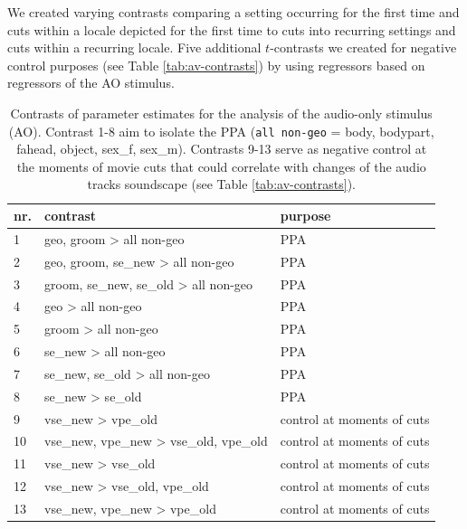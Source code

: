 \documentclass[english]{article}
\begin{document}

We created varying contrasts comparing a setting occurring for the first
time and cuts within a locale depicted for the first time to cuts into recurring
settings and cuts within a recurring locale.
Five additional $t$-contrasts we created for negative control purposes (see
Table \ref{tab:av-contrasts}) by using regressors based on regressors of the AO
stimulus.


\begin{table}[h!]
\caption{Contrasts of parameter estimates for the analysis of the audio-only stimulus (AO).
Contrast 1-8 aim to isolate the PPA (\texttt{all non-geo} = body, bodypart,
    fahead, object, sex\_f, sex\_m).
Contrasts 9-13 serve as negative control at the moments of movie cuts that could
    correlate with changes of the audio tracks soundscape (see Table \ref{tab:av-contrasts}).}
\label{tab:ao-contrasts}
\footnotesize
\begin{tabular}{lll}
\toprule
\textbf{nr.} &  \textbf{contrast} & \textbf{purpose} \\
\midrule
1 & geo, groom > all non-geo & PPA \tabularnewline
2 & geo, groom, se\_new > all non-geo & PPA \tabularnewline
3 & groom, se\_new, se\_old > all non-geo & PPA \tabularnewline
4 & geo > all non-geo & PPA \tabularnewline
5 & groom > all non-geo & PPA \tabularnewline
6 & se\_new > all non-geo & PPA \tabularnewline
7 & se\_new, se\_old > all non-geo & PPA \tabularnewline
8 & se\_new > se\_old & PPA \tabularnewline
9 & vse\_new > vpe\_old & control at moments of cuts \tabularnewline
10 & vse\_new, vpe\_new > vse\_old, vpe\_old & control at moments of cuts \tabularnewline
11 & vse\_new > vse\_old & control at moments of cuts \tabularnewline
12 & vse\_new > vse\_old, vpe\_old & control at moments of cuts \tabularnewline
13 & vse\_new, vpe\_new > vpe\_old & control at moments of cuts \tabularnewline
\end{tabular}
\end{table}
\end{document}

